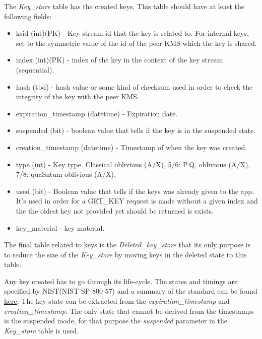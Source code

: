 \begin{refsection}
The \textit{Key\_store} table has the created keys. This table should have at least the following fields:
\begin{itemize}
	\item ksid (int)(PK) - Key stream id that the key is related to. For internal keys, set to the symmetric value of the id of the peer KMS which the key is shared.
	\item index (int)(PK) - index of the key in the context of the key stream (sequential).
	\item hash (tbd) - hash value or some kind of checksum used in order to check the integrity of the key with the peer \ac{KMS}.
	\item expiration\_timestamp (datetime) - Expiration date. 
	\item suspended (bit) - boolean value that tells if the key is in the suspended state.
	\item creation\_timestamp (datetime) - Timestamp of when the key was created.
	\item type (int) - Key type. Classical oblivious (A/X), 5/6: P.Q. oblivious (A/X), 7/8: quaSntum oblivious (A/X).
	\item used (bit) - Boolean value that tells if the keys was already given to the app. It's used in order for a GET\_KEY request is made without a given index and the the oldest key not provided yet should be returned is exists.  
	\item key\_material - key material. 
\end{itemize}

\vspace{5mm}

The final table related to keys is the \textit{Deleted\_key\_store} that its only purpose is to reduce the size of the \textit{Key\_store} by moving keys in the deleted state to this table.

\vspace{5mm}

Any key created has to go through its life-cycle. The states and timings are specified by NIST(NIST SP 800-57) and a summary of the standard can be found \href{https://cloud.ibm.com/docs/key-protect?topic=key-protect-key-states}{here}. The key state can be extracted from the \textit{expiration\_timestamp} and \textit{creation\_timestamp}. The only state that cannot be derived from the timestamps is the suspended mode, for that purpose the \textit{suspended} parameter in the \textit{Key\_store} table is used.

\vspace{5mm}


\end{refsection}
